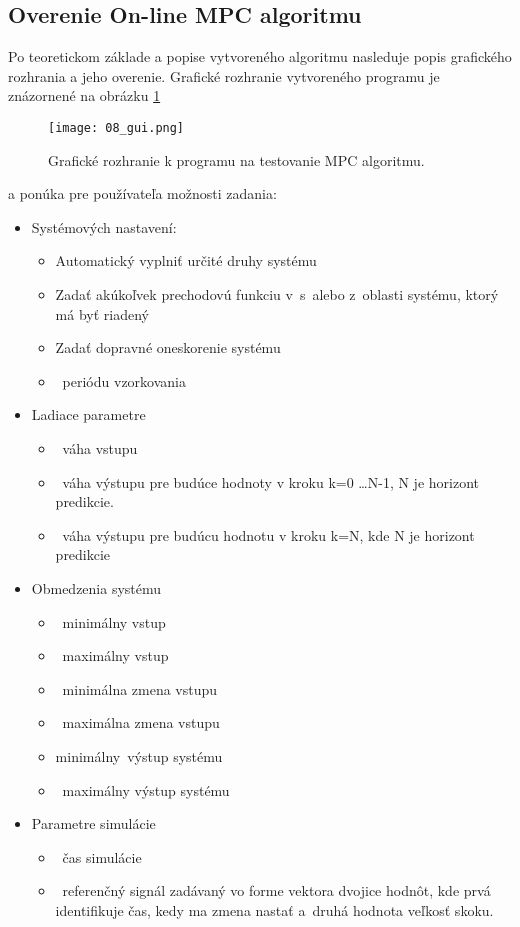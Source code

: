\subsection{Overenie On-line MPC algoritmu} \label{mpcprogram}
Po teoretickom základe a popise vytvoreného algoritmu nasleduje popis grafického rozhrania a jeho overenie. Grafické rozhranie vytvoreného programu je znázornené na obrázku \ref{08_gui} 

\begin{figure}[!htbp]
\centering
\texttt{[image: 08\_gui.png]}
\caption{Grafické rozhranie k programu na testovanie MPC algoritmu.}
\label{08_gui}
\end{figure}

a ponúka pre používateľa možnosti zadania:

\begin{itemize}
\item
  Systémových nastavení:

  \begin{itemize}
  \item
    Automatický vyplniť určité druhy systému
  \item
    Zadať akúkoľvek prechodovú funkciu v~s~alebo z~oblasti systému,
    ktorý má byť riadený
  \item
    Zadať dopravné oneskorenie systému
  \item
    ~periódu vzorkovania
  \end{itemize}
\item
  Ladiace parametre

  \begin{itemize}
  \item
    ~váha vstupu
  \item
    ~váha výstupu pre budúce hodnoty v kroku k=0 \dots N-1, N je horizont predikcie.
  \item
    ~váha výstupu pre budúcu hodnotu v kroku k=N, kde N je horizont predikcie
  \end{itemize}
\item
  Obmedzenia systému

  \begin{itemize}
  \item
    ~minimálny vstup
  \item
    ~maximálny vstup
  \item
    ~minimálna zmena vstupu
  \item
    ~maximálna zmena vstupu
  \item
    minimálny~výstup systému
  \item
    ~maximálny výstup systému
  \end{itemize}
\item
  Parametre simulácie

  \begin{itemize}
  \item
    ~čas simulácie
  \item
    ~referenčný signál zadávaný vo forme vektora dvojice hodnôt, kde prvá
    identifikuje čas, kedy ma zmena nastať a~druhá hodnota veľkosť
    skoku.
  \end{itemize}
\end{itemize}


